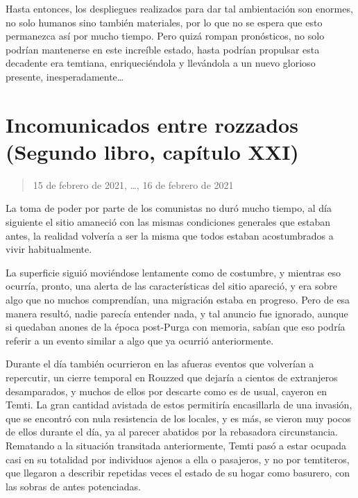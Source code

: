 \documentclass[
  spanish,
]{book}
\begin{document}
Hasta entonces, los despliegues realizados para dar tal ambientación son enormes, no solo humanos sino también materiales, por lo que no se espera que esto permanezca así por mucho tiempo. Pero quizá rompan pronósticos, no solo podrían mantenerse en este increíble estado, hasta podrían propulsar esta decadente era temtiana, enriqueciéndola y llevándola a un nuevo glorioso presente, inesperadamente\ldots{}

\hypertarget{incomunicados-entre-rozzados-segundo-libro-capuxedtulo-xxi}{%
\section{Incomunicados entre rozzados (Segundo libro, capítulo XXI)}\label{incomunicados-entre-rozzados-segundo-libro-capuxedtulo-xxi}}

\begin{quote}
15 de febrero de 2021, \ldots, 16 de febrero de 2021
\end{quote}

La toma de poder por parte de los comunistas no duró mucho tiempo, al día siguiente el sitio amaneció con las mismas condiciones generales que estaban antes, la realidad volvería a ser la misma que todos estaban acostumbrados a vivir habitualmente.

La superficie siguió moviéndose lentamente como de costumbre, y mientras eso ocurría, pronto, una alerta de las características del sitio apareció, y era sobre algo que no muchos comprendían, una migración estaba en progreso. Pero de esa manera resultó, nadie parecía entender nada, y tal anuncio fue ignorado, aunque si quedaban anones de la época post-Purga con memoria, sabían que eso podría referir a un evento similar a algo que ya ocurrió anteriormente.

Durante el día también ocurrieron en las afueras eventos que volverían a repercutir, un cierre temporal en Rouzzed que dejaría a cientos de extranjeros desamparados, y muchos de ellos por descarte como es de usual, cayeron en Temti. La gran cantidad avistada de estos permitiría encasillarla de una invasión, que se encontró con nula resistencia de los locales, y es más, se vieron muy pocos de ellos durante el día, ya al parecer abatidos por la rebasadora circunstancia. Rematando a la situación transitada anteriormente, Temti pasó a estar ocupada casi en su totalidad por individuos ajenos a ella o pasajeros, y no por temtiteros, que llegaron a describir repetidas veces el estado de su hogar como basurero, con las sobras de antes potenciadas.
\end{document}
